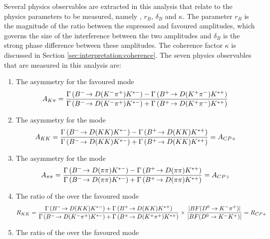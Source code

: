Several physics observables are extracted in this analysis that relate to the physics parameters to be measured, namely \Pgamma, $r_B$, $\delta_B$ and $\kappa$. The parameter $r_B$ is the magnitude of the ratio between the supressed and favoured amplitudes, which governs the size of the interference between the two amplitudes and $\delta_B$ is the strong phase difference between these amplitudes. The coherence factor $\kappa$ is discussed in Section \ref{sec:interpretation:coherence}. The seven physics observables that are measured in this analysis are:

\begin{enumerate}
\item{The \CP asymmetry for the favoured mode
\begin{equation}
A_{{K}\pi} = \frac{\Gamma\left({{{B}^-}}\!\rightarrow {\ensuremath{D}}({{K}^-}{{\pi}^+}){{K}^{*-}}\right) - \Gamma\left({{{B}^+}}\!\rightarrow {\ensuremath{D}}({{K}^+}{{\pi}^-}){{K}^{*+}}\right)}{\Gamma\left({{{B}^-}}\!\rightarrow {\ensuremath{D}}({{K}^-}{{\pi}^+}){{K}^{*-}}\right) + \Gamma\left({{{B}^+}}\!\rightarrow {\ensuremath{D}}({{K}^+}{{\pi}^-}){{K}^{*+}}\right)}
\label{eqn:Akpi}
\end{equation}
}
\item{The \CP asymmetry for the \decay{\D}{\Kp\Km} mode
\begin{equation}
A_{{K}{K}} = \frac{\Gamma\left({{{B}^-}}\!\rightarrow {\ensuremath{D}}({K}{K}){{K}^{*-}}\right) - \Gamma\left({{{B}^+}}\!\rightarrow {\ensuremath{D}}({K}{K}){{K}^{*+}}\right)}{\Gamma\left({{{B}^-}}\!\rightarrow {\ensuremath{D}}({K}{K}){{K}^{*-}}\right) + \Gamma\left({{{B}^+}}\!\rightarrow {\ensuremath{D}}({K}{K}){{K}^{*+}}\right)} = A_{CP+}
\label{eqn:Akk}
\end{equation}
}
\item{The \CP asymmetry for the \decay{\D}{\pip\pim} mode
\begin{equation}
A_{\pi\pi} = \frac{\Gamma\left({{{B}^-}}\!\rightarrow {\ensuremath{D}}(\pi\pi){{K}^{*-}}\right) - \Gamma\left({{{B}^+}}\!\rightarrow {\ensuremath{D}}(\pi\pi){{K}^{*+}}\right)}{\Gamma\left({{{B}^-}}\!\rightarrow {\ensuremath{D}}(\pi\pi){{K}^{*-}}\right) + \Gamma\left({{{B}^+}}\!\rightarrow {\ensuremath{D}}(\pi\pi){{K}^{*+}}\right)} = A_{CP+}
\label{eqn:Apipi}
\end{equation}
}
\item{The ratio of the \decay{\D}{\Kp\Km} over the favoured mode
\begin{equation}
R_{{K}{K}} = \frac{\Gamma\left({{{B}^-}}\!\rightarrow {\ensuremath{D}}({K}{K}){{K}^{*-}}\right) + \Gamma\left({{{B}^+}}\!\rightarrow {\ensuremath{D}}({K}{K}){{K}^{*+}}\right)}{\Gamma\left({{{B}^-}}\!\rightarrow {\ensuremath{D}}({{K}^-}{{\pi}^+}){{K}^{*-}}\right) + \Gamma\left({{{B}^+}}\!\rightarrow {\ensuremath{D}}({{K}^+}{{\pi}^+}){{K}^{*+}}\right)} \times \frac{|BF(D^0 \rightarrow K^-\pi^+)|}{|BF(D^0 \rightarrow K^-K^+)|} = R_{CP+}
\label{eqn:Rkk}
\end{equation}
}
\item{The ratio of the \decay{\D}{\pip\pim} over the favoured mode
}
\end{enumerate}

